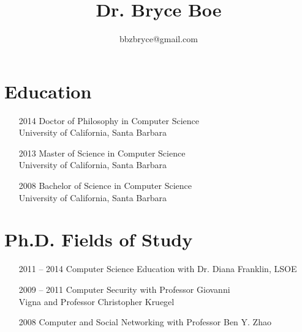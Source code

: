 \documentclass[10pt,letterpaper,oneside,twocolumn]{article}
\begin{document}
\setcounter{secnumdepth}{0}  %

\title{Dr. Bryce Boe}
\author{bbzbryce@gmail.com}
\date{}
\maketitle


\section{Education}
\begin{itemize}
  \item [2014] Doctor of Philosophy in Computer Science\\ University of
    California, Santa Barbara
  \item [2013] Master of Science in Computer Science\\ University of
    California, Santa Barbara
  \item [2008] Bachelor of Science in Computer Science\\ University of
    California, Santa Barbara
\end{itemize}


\section{Ph.D. Fields of Study}
\begin{itemize}
  \item [2011 -- 2014] Computer Science Education with Dr. Diana Franklin, LSOE
  \item [2009 -- 2011] Computer Security with Professor Giovanni\\ Vigna
    and Professor Christopher Kruegel
  \item [2008] Computer and Social Networking with Professor Ben Y. Zhao
\end{itemize}
\end{document}

